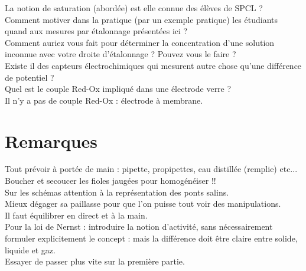 \documentclass[12pt,prb,aps,epsf]{article}
\begin{document}
La notion de saturation (abordée) est elle connue des élèves de SPCL ?\\

Comment motiver dans la pratique (par un exemple pratique) les étudiants quand aux mesures par étalonnage présentées ici ?\\

Comment auriez vous fait pour déterminer la concentration d'une solution inconnue avec votre droite d'étalonnage ? Pouvez vous le faire ?\\

Existe il des capteurs électrochimiques qui mesurent autre chose qu'une différence de potentiel ?\\

Quel est le couple Red-Ox impliqué dans une électrode verre ?\\
Il n'y a pas de couple Red-Ox : électrode à membrane.

\section*{Remarques}
Tout prévoir à portée de main : pipette, propipettes, eau distillée (remplie) etc...\\
Boucher et secoucer les fioles jaugées pour homogénéiser !!\\
Sur les schémas attention à la représentation des ponts salins.\\
Mieux dégager sa paillasse pour que l'on puisse tout voir des manipulations.\\
Il faut équilibrer en direct et à la main.\\
Pour la loi de Nernst : introduire la notion d'activité, sans nécessairement formuler explicitement le concept : mais la différence doit être claire entre solide, liquide et gaz.\\
Essayer de passer plus vite sur la première partie.
\end{document}
